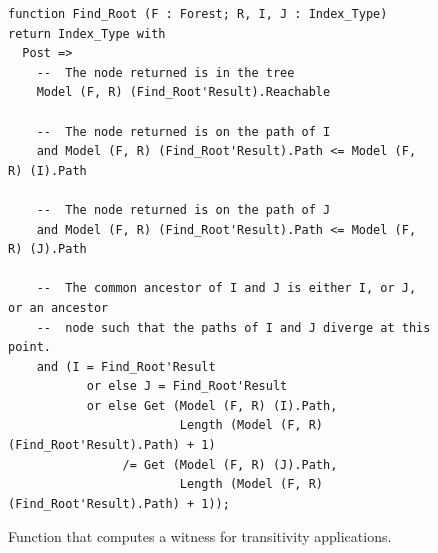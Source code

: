 \documentclass{llncs}
\begin{document}
\begin{figure}
\vspace{-0.5cm}
\begin{small}
\begin{lstlisting}
function Find_Root (F : Forest; R, I, J : Index_Type) return Index_Type with
  Post =>
    --  The node returned is in the tree
    Model (F, R) (Find_Root'Result).Reachable

    --  The node returned is on the path of I
    and Model (F, R) (Find_Root'Result).Path <= Model (F, R) (I).Path

    --  The node returned is on the path of J
    and Model (F, R) (Find_Root'Result).Path <= Model (F, R) (J).Path

    --  The common ancestor of I and J is either I, or J, or an ancestor
    --  node such that the paths of I and J diverge at this point.
    and (I = Find_Root'Result
           or else J = Find_Root'Result
           or else Get (Model (F, R) (I).Path,
                        Length (Model (F, R) (Find_Root'Result).Path) + 1)
                /= Get (Model (F, R) (J).Path,
                        Length (Model (F, R) (Find_Root'Result).Path) + 1));
\end{lstlisting}
\end{small}
\caption{\label{fig-proof-wit} Function that computes a witness for transitivity applications.}
\vspace{-0.5cm}
\end{figure}
\end{document}
